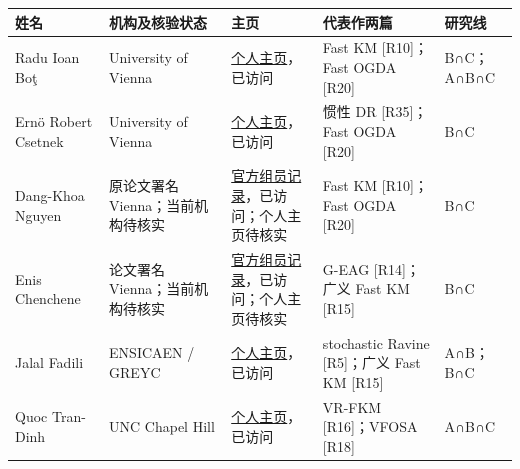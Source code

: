 \documentclass[
  chinese,
  10pt,
  a4paper,
]{article}
\newcounter{none} %
\begin{document}
{\def\LTcaptype{none} %
\begin{longtable}[]{@{}
  >{\raggedright\arraybackslash}p{}
  >{\raggedright\arraybackslash}p{}
  >{\raggedright\arraybackslash}p{}
  >{\raggedright\arraybackslash}p{}
  >{\raggedright\arraybackslash}p{}@{}}
\toprule\noalign{}
\begin{minipage}[b]{\linewidth}\raggedright
姓名
\end{minipage} & \begin{minipage}[b]{\linewidth}\raggedright
机构及核验状态
\end{minipage} & \begin{minipage}[b]{\linewidth}\raggedright
主页
\end{minipage} & \begin{minipage}[b]{\linewidth}\raggedright
代表作两篇
\end{minipage} & \begin{minipage}[b]{\linewidth}\raggedright
研究线
\end{minipage} \\
\midrule\noalign{}
\endhead
\bottomrule\noalign{}
\endlastfoot
Radu Ioan Boţ & University of Vienna &
\href{https://www.mat.univie.ac.at/~rabot/}{个人主页}，已访问 & Fast KM
{[}R10{]}；Fast OGDA {[}R20{]} & B∩C；A∩B∩C \\
Ernö Robert Csetnek & University of Vienna &
\href{https://www.mat.univie.ac.at/~csercser/index.htm}{个人主页}，已访问
& 惯性 DR {[}R35{]}；Fast OGDA {[}R20{]} & B∩C \\
Dang-Khoa Nguyen & 原论文署名 Vienna；当前机构待核实 &
\href{https://www.mat.univie.ac.at/~rabot/group.html}{官方组员记录}，已访问；个人主页待核实
& Fast KM {[}R10{]}；Fast OGDA {[}R20{]} & B∩C \\
Enis Chenchene & 2026 论文署名 Vienna；当前机构待核实 &
\href{https://www.mat.univie.ac.at/~rabot/group.html}{官方组员记录}，已访问；个人主页待核实
& G-EAG {[}R14{]}；广义 Fast KM {[}R15{]} & B∩C \\
Jalal Fadili & ENSICAEN / GREYC &
\href{https://fadili.users.greyc.fr/}{个人主页}，已访问 & stochastic
Ravine {[}R5{]}；广义 Fast KM {[}R15{]} & A∩B；B∩C \\
Quoc Tran-Dinh & UNC Chapel Hill &
\href{https://quoctd.web.unc.edu/}{个人主页}，已访问 & VR-FKM
{[}R16{]}；VFOSA {[}R18{]} & A∩B∩C \\

\end{longtable}}
\end{document}
